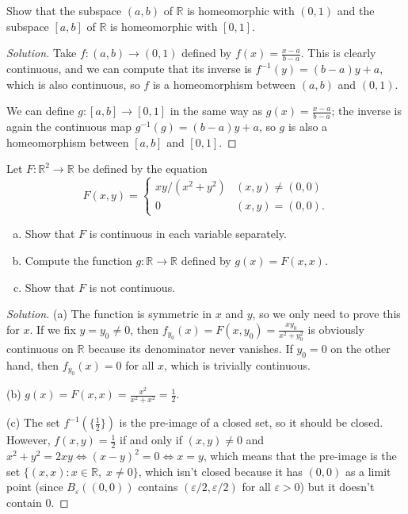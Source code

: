 \documentclass[10pt]{article}
\providecommand{\eps}{\varepsilon}
\providecommand{\half}{\frac{1}{2}}
\providecommand{\RR}{\mathbb R}
\providecommand{\ii}{\item}
\providecommand{\inv}{^{-1}}
\newenvironment{soln}{\begin{proof}[Solution]}{\end{proof}}
\begin{document}
\begin{problem}
    [Munkres 18.5]
    Show that the subspace $(a,b)$ of $\RR$ is homeomorphic with $(0,1)$
    and the subspace $[a,b]$ of $\RR$ is homeomorphic with $[0,1]$.
\end{problem}

\begin{soln}
    Take $f\colon(a,b)\to(0,1)$ defined by $f(x) = \frac{x-a}{b-a}$.
    This is clearly continuous, and we can compute that its inverse is
    $f\inv(y) = (b-a)y + a$, which is also continuous,
    so $f$ is a homeomorphism between $(a,b)$ and $(0,1)$.

    We can define $g\colon[a,b]\to[0,1]$ in the same way
    as $g(x) = \frac{x-a}{b-a}$; the inverse is again
    the continuous map $g\inv(g) = (b-a)y + a$, so $g$ is also a homeomorphism
    between $[a,b]$ and $[0,1]$.
\end{soln}

\begin{problem}
    [Munkres 18.12]
    Let $F\colon\RR^2\to\RR$ be defined by the equation
    \begin{equation*}
        F(x,y) = \begin{cases}
	    xy/(x^2+y^2) & (x,y)\ne(0,0)\\
	    0 & (x,y) = (0,0).
        \end{cases}
    \end{equation*}
    \begin{enumerate}[(a)]
        \ii Show that $F$ is continuous in each variable separately.
	\ii Compute the function $g\colon\RR\to\RR$
	defined by $g(x) = F(x,x)$.
	\ii Show that $F$ is not continuous.
    \end{enumerate}
\end{problem}

\begin{soln}
    (a) The function is symmetric in $x$ and $y$,
    so we only need to prove this for $x$. If we fix $y=y_0\ne 0$, then
    $f_{y_0}(x) = F(x,y_0) = \frac{xy_0}{x^2+y_0^2}$ is obviously continuous
    on $\RR$ because its denominator never vanishes.
    If $y_0=0$ on the other hand, then $f_{y_0}(x)=0$ for all $x$,
    which is trivially continuous.

    (b) $g(x) = F(x,x) = \frac{x^2}{x^2+x^2} = \half$.

    (c) The set $f\inv(\{\half\})$ is the pre-image of a closed set,
    so it should be closed. However, $f(x,y) = \half$ if and only if
    $(x,y)\ne0$ and $x^2+y^2 = 2xy\iff (x-y)^2 = 0\iff x=y$, which
    means that the pre-image is the set $\{(x,x) : x\in\RR,\; x\ne 0\}$,
    which isn't closed because it has $(0,0)$ as a limit point
    (since $B_\eps((0,0))$ contains $(\eps/2,\eps/2)$ for all $\eps>0$)
    but it doesn't contain $0$.
\end{soln}
\end{document}
